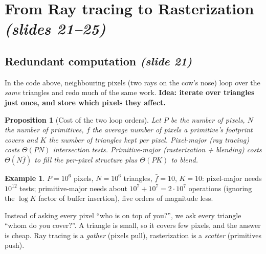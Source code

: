 \documentclass[11pt,a4paper]{article}
\newcommand{\sr}[1]{\texorpdfstring{\emph{(#1)}}{(#1)}}
\theoremstyle{definition}
\newtheorem{example}[definition]{Example}
\theoremstyle{plain}
\newtheorem{proposition}[definition]{Proposition}
\theoremstyle{remark}
\begin{document}
\section{From Ray tracing to Rasterization \sr{slides 21--25}}
\subsection{Redundant computation \sr{slide 21}}
In the code above, neighbouring pixels (two rays on the cow's nose) loop over the \emph{same} triangles and redo much of the same work. \textbf{Idea: iterate over triangles just once, and store which pixels they affect.}

\begin{proposition}[Cost of the two loop orders]
Let $P$ be the number of pixels, $N$ the number of primitives, $\bar f$ the average number of pixels a primitive's footprint covers and $K$ the number of triangles kept per pixel. Pixel-major (ray tracing) costs $\Theta(PN)$ intersection tests. Primitive-major (rasterization + blending) costs $\Theta(N\bar f)$ to fill the per-pixel structure plus $\Theta(PK)$ to blend.
\end{proposition}
\begin{example}
$P=10^6$ pixels, $N=10^6$ triangles, $\bar f=10$, $K=10$: pixel-major needs $10^{12}$ tests; primitive-major needs about $10^{7}+10^{7}=2\cdot10^{7}$ operations (ignoring the $\log K$ factor of buffer insertion), five orders of magnitude less.
\end{example}
\begin{intuition}
Instead of asking every pixel ``who is on top of you?'', we ask every triangle ``whom do you cover?''. A triangle is small, so it covers few pixels, and the answer is cheap. Ray tracing is a \emph{gather} (pixels pull), rasterization is a \emph{scatter} (primitives push).
\end{intuition}
\end{document}
